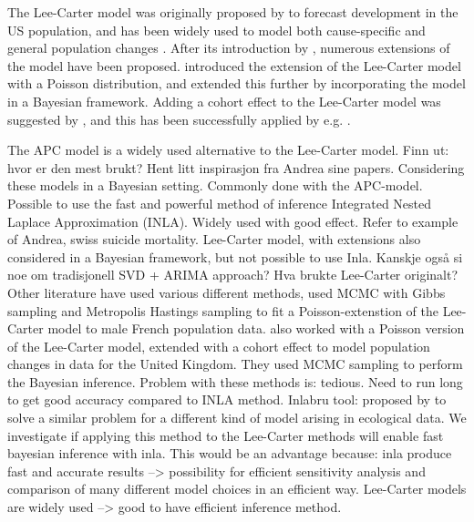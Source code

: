 \newline
The Lee-Carter model was originally proposed by \textcite{LeeCarter1992} to forecast development in the US population, and has been widely used to model both cause-specific and general population changes \parencite{GirosiKing2007}. After its introduction by \textcite{LeeCarter1992}, numerous extensions of the model have been proposed. \textcite{BROUHNS2002373} introduced the extension of the Lee-Carter model with a Poisson distribution, and \textcite{CZADO2005260} extended this further by incorporating the model in a Bayesian framework. Adding a cohort effect to the Lee-Carter model was suggested by \textcite{RENSHAW2006556}, and this has been successfully applied by e.g. \textcite{Wisniowski2015}.
\newline

\newpar \textcolor{myDarkGreen}{The APC model is a widely used alternative to the Lee-Carter model. Finn ut: hvor er den mest brukt? Hent litt inspirasjon fra Andrea sine papers.} 
\newline
\newpar \textcolor{myDarkGreen}{Considering these models in a Bayesian setting. Commonly done with the APC-model. Possible to use the fast and powerful method of inference Integrated Nested Laplace Approximation (INLA). Widely used with good effect. Refer to example of Andrea, swiss suicide mortality. }
\newline
\newpar \textcolor{myDarkGreen}{Lee-Carter model, with extensions also considered in a Bayesian framework, but not possible to use Inla. Kanskje også si noe om tradisjonell SVD + ARIMA approach? Hva brukte Lee-Carter originalt? Other literature have used various different methods, \textcite{CZADO2005260} used MCMC with Gibbs sampling and Metropolis Hastings sampling to fit a Poisson-extenstion of the Lee-Carter model to male French population data. \textcite{Wisniowski2015} also worked with a Poisson version of the Lee-Carter model, extended with a cohort effect to model population changes in data for the United Kingdom. They used MCMC sampling to perform the Bayesian inference. Problem with these methods is: tedious. Need to run long to get good accuracy compared to INLA method.}
\newline 
\newpar \textcolor{myDarkGreen}{Inlabru tool: proposed by \textcite{BachlLindgren2019} to solve a similar problem for a different kind of model arising in ecological data. We investigate if applying this method to the Lee-Carter methods will enable fast bayesian inference with inla. This would be an advantage because: inla produce fast and accurate results --> possibility for efficient sensitivity analysis and comparison of many different model choices in an efficient way. Lee-Carter models are widely used --> good to have efficient inference method.} 
